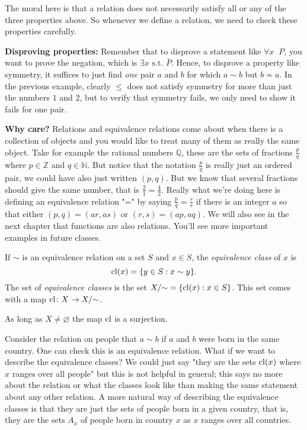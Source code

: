 \documentclass[11pt,dvipsnames]{book}
\numberwithin{equation}{section} %
\numberwithin{figure}{section} %
\numberwithin{table}{section} %
\begin{document}
The moral here is that a relation does not necessarily satisfy all or any of the three properties above. So whenever we define a relation, we need to check these properties carefully.


\begin{protip}
{\bf Disproving properties:} Remember that to disprove a statement like $\forall x\;\; P$, you want to prove the negation, which is $\exists x\mbox{ s.t. } \bar{P}$. Hence, to disprove a property like symmetry, it suffices to just find {\it one} pair $a$ and $b$ for which $a\sim b$ but $b\not\sim a$. In the previous example, clearly $\leq  $ does not satisfy symmetry for more than just the numbers $1$ and $2$, but to verify that symmetry fails, we only need to show it fails for one pair.
\end{protip}



{\bf Why care?} Relations and equivalence relations come about when there is a collection of objects and you would like to treat many of them as really the same object. Take for example the rational numbers $\mathbb{Q}$, these are the sets of fractions $\frac{p}{q}$ where $p\in\mathbb{Z}$ and $q\in \mathbb{N}$. But notice that the notation $\frac{p}{q}$ is really just an ordered pair, we could have also just written $(p,q)$. But we know that several fractions should give the same number, that is $\frac{2}{1}=\frac{4}{2}$. Really what we're doing here is defining an equivalence relation "=" by saying $\frac{p}{q}=\frac{r}{s}$ if there is an integer $a$ so that either $(p,q)=(ar,as)$ or $(r,s)=(ap,aq)$. We will also see in the next chapter that functions are also relations. You'll see more important examples in future classes. 

\def\cl{{\rm cl}}



\begin{definition}
If $\sim$ is an equivalence relation on a set $S$ and $x\in S$, the {\it equivalence class} of $x$ is 
\[
\cl(x) = \{y\in S : x\sim y\}.
\]
The set of {\it equivalence classes} is the set $X/{\sim} = \{\cl(x) : x\in S\}$.
This set comes with a map $\cl \colon X \to X/{\sim}$.
\end{definition}

As long as $X \neq \varnothing$ the map $\cl$ is a surjection.

\begin{example}
Consider the relation on people that $a\sim b$ if $a$ and $b$ were born in the same country. One can check this is an equivalence relation. What if we want to describe the equivalence classes? We could just say "they are the sets $\cl(x)$ where $x$ ranges over all people" but this is not helpful in general; this says no more about the relation or what the classes look like than making the same statement about any other relation. A more natural way of describing the equivalence classes is that they are just the sets of people born in a given country, that is, they are the sets $A_x$ of people born in country $x$ as $x$ ranges over all countries.
\end{example}
\end{document}
